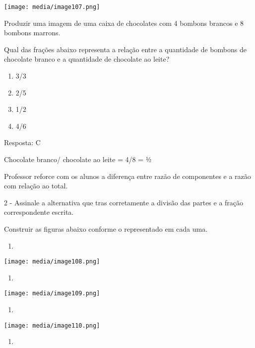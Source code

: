 \texttt{[image: media/image107.png]}

Produzir uma imagem de uma caixa de chocolates com 4 bombons brancos e 8
bombons marrons.

Qual das frações abaixo representa a relação entre a quantidade de
bombons de chocolate branco e a quantidade de chocolate ao leite?

\begin{enumerate}
\def\labelenumi{\alph{enumi})}
\item
  3/3
\item
  2/5
\item
  1/2
\item
  4/6
\end{enumerate}

Resposta: C

Chocolate branco/ chocolate ao leite = 4/8 = ½

Professor reforce com os alunos a diferença entre razão de componentes e
a razão com relação ao total.

2 - Assinale a alternativa que tras corretamente a divisão das partes e
a fração correspondente escrita.

Construir as figuras abaixo conforme o representado em cada uma.

\begin{enumerate}
\def\labelenumi{\alph{enumi})}
\item
\end{enumerate}

\texttt{[image: media/image108.png]}

\begin{enumerate}
\def\labelenumi{\alph{enumi})}
\item
\end{enumerate}

\texttt{[image: media/image109.png]}

\begin{enumerate}
\def\labelenumi{\alph{enumi})}
\item
\end{enumerate}

\texttt{[image: media/image110.png]}

\begin{enumerate}
\def\labelenumi{\alph{enumi})}
\item
\end{enumerate}

